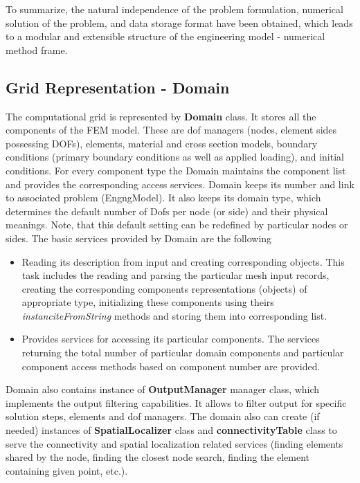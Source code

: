 \documentclass[12pt,draft]{article}
\newcommand{\class}[1]{{\bf #1}}
\newcommand{\service}[1]{{\em #1}}
\begin{document}
To summarize, the natural independence of the problem formulation,
numerical solution of the problem, and data storage format have been
obtained, which leads to a modular and extensible structure of the engineering
model - numerical method frame.

\subsection{Grid Representation - Domain}
The computational grid is represented by \class{Domain} class.
It stores all the components of the FEM model. These are dof managers
(nodes, element sides possessing DOFs), elements, material and cross
section models, boundary conditions
(primary boundary conditions as well as applied loading), and initial
conditions. For every component type the Domain maintains the
component list and provides the corresponding access services.
Domain keeps its number and link to associated problem (EngngModel).
It also keeps its domain type, which determines the default number of
Dofs per node (or side) and their physical meanings. Note, that this 
default setting can be redefined by particular nodes or sides.
The basic services provided by Domain are the following
\begin{itemize}
\item
Reading its description from input and creating corresponding objects.
This task includes the reading and parsing the particular mesh input
records, creating the corresponding components representations
(objects) of appropriate type, initializing these components using
theirs \service{instanciteFromString} methods and storing them into
corresponding list.
\item
Provides services for accessing its particular components. 
The services returning the total number of particular domain
components and particular component access methods based on component
number are provided. 
\end{itemize}
Domain also contains instance of \class{OutputManager} manager class,
which implements the output filtering capabilities. It allows to
filter output for specific solution steps, elements and dof managers.
The domain also can create (if needed) instances of
\class{SpatialLocalizer} class and \class{connectivityTable} class
to serve the connectivity and  spatial localization related services
(finding elements shared by the node, finding the closest node search,
finding the element containing given point, etc.).
\end{document}
